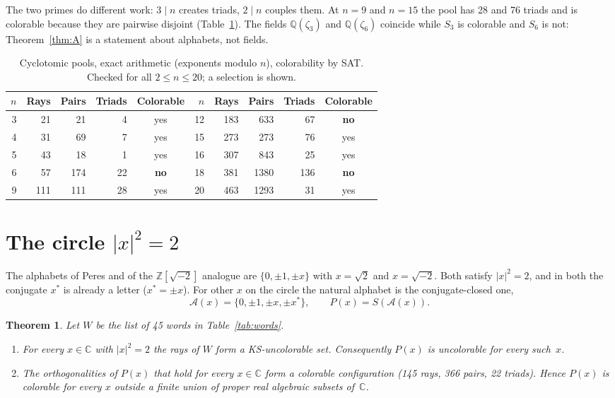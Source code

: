 \documentclass[11pt,a4paper]{article}
\newtheorem{theorem}{Theorem}
\theoremstyle{remark}
\newcommand{\C}{\mathbb{C}}
\newcommand{\Z}{\mathbb{Z}}
\newcommand{\Q}{\mathbb{Q}}
\begin{document}
The two primes do different work: $3\mid n$ creates triads, $2\mid n$ couples them.  At $n=9$ and
$n=15$ the pool has 28 and 76 triads and is colorable because they are pairwise disjoint
(Table~\ref{tab:cyc}).  The fields $\Q(\zeta_3)$ and $\Q(\zeta_6)$ coincide while $S_3$ is
colorable and $S_6$ is not: Theorem~\ref{thm:A} is a statement about alphabets, not fields.

\begin{table}[t]
\centering
\caption{Cyclotomic pools, exact arithmetic (exponents modulo $n$), colorability by SAT.
Checked for all $2\le n\le20$; a selection is shown.}
\label{tab:cyc}
\begin{tabular}{rrrrc@{\qquad\qquad}rrrrc}
\toprule
$n$ & Rays & Pairs & Triads & Colorable & $n$ & Rays & Pairs & Triads & Colorable\\
\midrule
3 & 21 & 21 & 4 & yes & 12 & 183 & 633 & 67 & \textbf{no}\\
4 & 31 & 69 & 7 & yes & 15 & 273 & 273 & 76 & yes\\
5 & 43 & 18 & 1 & yes & 16 & 307 & 843 & 25 & yes\\
6 & 57 & 174 & 22 & \textbf{no} & 18 & 381 & 1380 & 136 & \textbf{no}\\
9 & 111 & 111 & 28 & yes & 20 & 463 & 1293 & 31 & yes\\
\bottomrule
\end{tabular}
\end{table}

\section{The circle $|x|^2=2$}\label{sec:circle}

The alphabets of Peres and of the $\Z[\sqrt{-2}]$ analogue are $\{0,\pm1,\pm x\}$ with
$x=\sqrt2$ and $x=\sqrt{-2}$.  Both satisfy $|x|^2=2$, and in both the conjugate $x^{*}$ is
already a letter ($x^{*}=\pm x$).  For other $x$ on the circle the natural alphabet is the
conjugate-closed one,
\[
\mathcal A(x)=\{0,\pm1,\pm x,\pm x^{*}\},\qquad P(x)=S(\mathcal A(x)).
\]

\begin{theorem}\label{thm:B}
Let $W$ be the list of 45 words in Table~\ref{tab:words}.
\begin{enumerate}
\item[(i)] For every $x\in\C$ with $|x|^2=2$ the rays of $W$ form a KS-uncolorable set.
Consequently $P(x)$ is uncolorable for every such~$x$.
\item[(ii)] The orthogonalities of $P(x)$ that hold for every $x\in\C$ form a colorable
configuration (145 rays, 366 pairs, 22 triads).  Hence $P(x)$ is colorable for every $x$ outside a finite union of proper real
algebraic subsets of~$\C$.
\end{enumerate}
\end{theorem}
\end{document}
